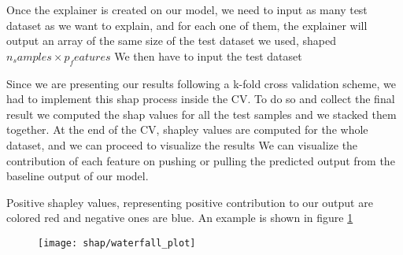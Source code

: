 \documentclass[a4paper,11pt]{article}
\begin{document}
Once the explainer is created on our model, we need to input as many test dataset as we want to explain, and for each one of them, the explainer will output an array of the same size of the test dataset we used, shaped $n_samples \times p_features$
We then have to input the test dataset


Since we are presenting our results following a k-fold cross validation scheme, we had to implement this shap process inside the CV.
To do so and collect the final result we computed the shap values for all the test samples and we stacked them together.
At the end of the CV, shapley values are computed for the whole dataset, and we can proceed to visualize the results
We can visualize the contribution of each feature on pushing or pulling the predicted output from the baseline output of our model.

Positive shapley values, representing positive contribution to our output are colored red and negative ones are blue.
An example is shown in figure \ref{fig:shap_waterfall}

\begin{figure}[h]
\texttt{[image: shap/waterfall\_plot]}
\caption{}\label{fig:shap_waterfall}
\end{figure}




\appendix
\end{document}
